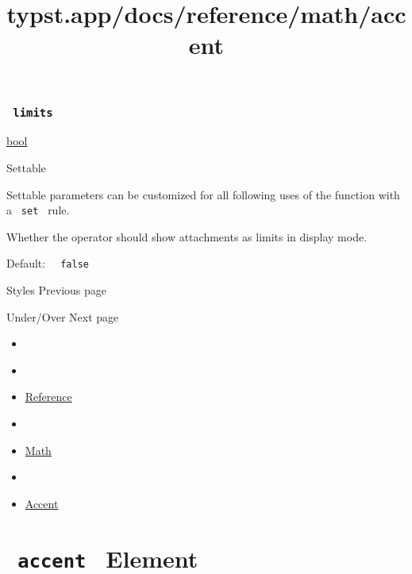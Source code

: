 \subsubsection{\texorpdfstring{\texttt{\ limits\ }}{ limits }}\label{parameters-limits}

\href{/docs/reference/foundations/bool/}{bool}

{{ Settable }}

\label{parameters-limits-settable-tooltip}
Settable parameters can be customized for all following uses of the
function with a \texttt{\ set\ } rule.

Whether the operator should show attachments as limits in display mode.

Default: \texttt{\ }{\texttt{\ false\ }}\texttt{\ }

\href{/docs/reference/math/styles/}{\pandocbounded{}}

{ Styles } { Previous page }

\href{/docs/reference/math/underover/}{\pandocbounded{}}

{ Under/Over } { Next page }


\title{typst.app/docs/reference/math/accent}

\begin{itemize}
\tightlist
\item
  \href{/docs}{}
\item
  
\item
  \href{/docs/reference/}{Reference}
\item
  
\item
  \href{/docs/reference/math/}{Math}
\item
  
\item
  \href{/docs/reference/math/accent/}{Accent}
\end{itemize}

\section{\texorpdfstring{\texttt{\ accent\ } {{ Element
}}}{ accent   Element }}\label{summary}

